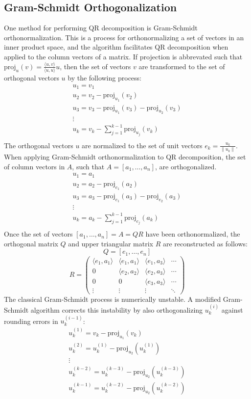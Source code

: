 \documentclass{article}
\begin{document}
\subsection*{Gram-Schmidt Orthogonalization}

One method for performing QR decomposition is Gram-Schmidt orthonormalization. This is a process for orthonormalizing a set of vectors in an inner product space, and the algorithm facilitates QR decomposition when applied to the column vectors of a matrix. If projection is abbrevated such that $\mathrm{proj}_u(v)=\frac{\langle u,v \rangle}{\langle u,u \rangle}u$, then the set of vectors $v$ are transformed to the set of orthogonal vectors $u$ by the following process:
$$\begin{array}{l}
u_1=v_1\\
u_2=v_2-\mathrm{proj}_{u_1}(v_2)\\
u_3=v_3-\mathrm{proj}_{u_1}(v_3)-\mathrm{proj}_{u_2}(v_3)\\
\vdots\\
u_k=v_k-\sum_{j=1}^{k-1}\mathrm{proj}_{u_j}(v_k)\\
\end{array}$$
The orthogonal vectors $u$ are normalized to the set of unit vectors $e_k=\frac{u_k}{\|u_k\|}$. When applying Gram-Schmidt orthonormalization to QR decomposition, the set of column vectors in $A$, such that $A=[a_1,\ldots,a_n]$, are orthogonalized.
$$\begin{array}{l}
u_1=a_1\\
u_2=a_2-\mathrm{proj}_{e_1}(a_2)\\
u_3=a_3-\mathrm{proj}_{e_1}(a_3)-\mathrm{proj}_{e_2}(a_3)\\
\vdots\\
u_k=a_k-\sum_{j=1}^{k-1}\mathrm{proj}_{e_j}(a_k)\\
\end{array}$$
Once the set of vectors $[a_1,\ldots,a_n]=A=QR$ have been orthonormalized, the orthogonal matrix $Q$ and upper triangular matrix $R$ are reconstructed as follows:
$$Q=[e_1,\ldots,e_n]$$
$$R=\left(\begin{array}{cccc}
\langle e_1,a_1 \rangle & \langle e_1,a_1 \rangle & \langle e_1,a_3 \rangle & \cdots \\
0 & \langle e_2,a_2 \rangle & \langle e_2,a_3 \rangle & \cdots \\
0 & 0 & \langle e_3,a_3 \rangle & \cdots \\
\vdots & \vdots & \vdots & \ddots
\end{array}\right)$$
The classical Gram-Schmidt process is numerically unstable. A modified Gram-Schmidt algorithm corrects this instability by also orthogonalizing $u_k^{(i)}$ against rounding errors in $u_k^{(i-1)}$:
$$\begin{array}{l}
u_k^{(1)}=v_k-\mathrm{proj}_{u_1}(v_k)\\
u_k^{(2)}=u_k^{(1)}-\mathrm{proj}_{u_2}(u_k^{(1)})\\
\vdots\\
u_k^{(k-2)}=u_k^{(k-3)}-\mathrm{proj}_{u_2}(u_k^{(k-3)})\\
u_k^{(k-1)}=u_k^{(k-2)}-\mathrm{proj}_{u_2}(u_k^{(k-2)})\\
\end{array}$$
\end{document}
